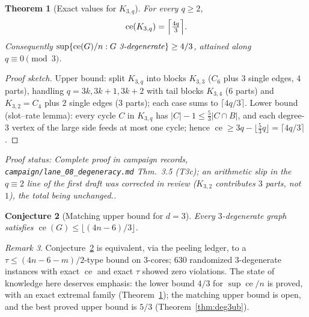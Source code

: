 \documentclass[a4paper,11pt]{amsart}
\newtheorem{theorem}{Theorem}[section]
\newtheorem{conjecture}[theorem]{Conjecture}
\theoremstyle{definition}
\theoremstyle{remark}
\newtheorem{remark}[theorem]{Remark}
\newcommand{\ce}{\operatorname{ce}}
\newcommand{\proofsrc}[1]{\par\smallskip\noindent\begin{sloppypar}\small\emph{Proof status: #1.}\end{sloppypar}\par\smallskip}
\begin{document}
\begin{theorem}[Exact values for $K_{3,q}$]\label{thm:k3q}
For every $q\ge2$,
\[
\ce(K_{3,q})=\Bigl\lceil \tfrac{4q}{3}\Bigr\rceil .
\]
Consequently $\sup\{\ce(G)/n: G\ \text{\emph{3-degenerate}}\}\ge 4/3$, attained along $q\equiv0\pmod 3$.
\end{theorem}
\begin{proof}[Proof sketch]
Upper bound: split $K_{3,q}$ into blocks $K_{3,3}$ ($C_6$ plus $3$ single edges, $4$ parts), handling
$q=3k,3k+1,3k+2$ with tail blocks $K_{3,4}$ ($6$ parts) and $K_{3,2}=C_4$ plus $2$ single edges
($3$ parts); each case sums to $\lceil4q/3\rceil$. Lower bound (slot--rate lemma): every cycle $C$ in
$K_{3,q}$ has $|C|-1\le\tfrac53|C\cap B|$, and each degree-$3$ vertex of the large side feeds at most one
cycle; hence $\ce\ge 3q-\lfloor\tfrac53 q\rfloor=\lceil 4q/3\rceil$.
\end{proof}
\proofsrc{Complete proof in campaign records, \texttt{campaign/lane\_08\_degeneracy.md} Thm.~3.5 (T3c); an
arithmetic slip in the $q\equiv2$ line of the first draft was corrected in review ($K_{3,2}$ contributes
$3$ parts, not $1$), the total being unchanged.}

\begin{conjecture}[Matching upper bound for $d=3$]\label{conj:t3b}
Every $3$-degenerate graph satisfies $\ce(G)\le\lfloor(4n-6)/3\rfloor$.
\end{conjecture}
\begin{remark}
Conjecture~\ref{conj:t3b} is equivalent, via the peeling ledger, to a $\tau\le(4n-6-m)/2$-type bound on
$3$-cores; $630$ randomized $3$-degenerate instances with exact $\ce$ and exact $\tau$ showed zero
violations. The state of knowledge here deserves emphasis: the lower bound $4/3$ for $\sup\ce/n$ is
proved, with an exact extremal family (Theorem~\ref{thm:k3q}); the matching upper bound is open, and the
best proved upper bound is $5/3$ (Theorem~\ref{thm:deg3ub}).
\end{remark}
\end{document}
